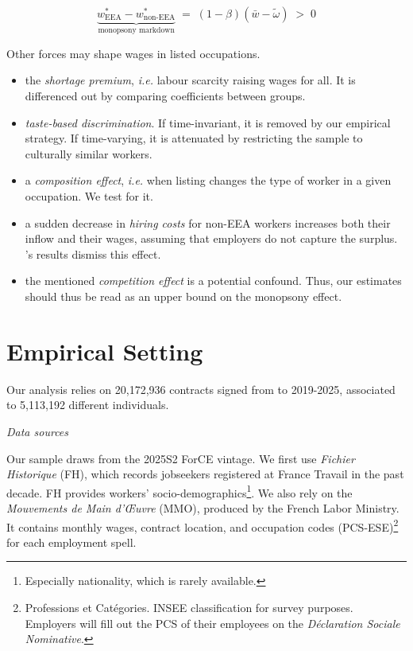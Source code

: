 \documentclass[10pt, a4paper]{article}
\begin{document}
\begin{equation}
  \underbrace{w^*_{\text{EEA}} - w^*_{\text{non-EEA}}}_{\text{monopsony markdown}}
  \;=\; (1-\beta)(\bar w - \tilde\omega) \;>\; 0
  \label{eq:markdown}
\end{equation}

\noindent Other forces may shape wages in listed occupations.
\begin{itemize}
    \item the \textit{shortage premium}, \textit{i.e.} labour scarcity raising wages for all. It is differenced out by comparing coefficients between groups. 
    \item \textit{taste-based discrimination}. If time-invariant, it is removed by our empirical strategy. If time-varying, it is attenuated by restricting the sample to culturally similar workers.
    \item a \textit{composition effect}, \textit{i.e.} when listing changes the type of worker in a given occupation. We test for it.
    \item a sudden decrease in \textit{hiring costs} for non-EEA workers increases both their inflow and their wages, assuming that employers do not capture the surplus. \citet{Signorelli2024}'s results dismiss this effect. 
    \item the mentioned \textit{competition effect} is a potential confound. Thus, our estimates should thus be read as an upper bound on the monopsony effect. 
\end{itemize} 
\medskip 

\section{Empirical Setting}
\medskip

Our analysis relies on 20,172,936 contracts signed from to 2019-2025, associated to 5,113,192 different individuals. 

\noindent \textit{Data sources}

\noindent Our sample draws from the 2025S2 ForCE vintage. We first use \textit{Fichier Historique} (FH), which records jobseekers registered at France Travail in the past decade. FH provides workers' socio-demographics\footnote{Especially nationality, which is rarely available.}. We also rely on the \textit{Mouvements de Main d'Œuvre} (MMO), produced by the French Labor Ministry. It contains monthly wages, contract location, and occupation codes (PCS-ESE)\footnote{Professions et Catégories. INSEE classification for survey purposes. Employers will fill out the PCS of their employees on the \textit{Déclaration Sociale Nominative}.} for each employment spell. 
\end{document}

